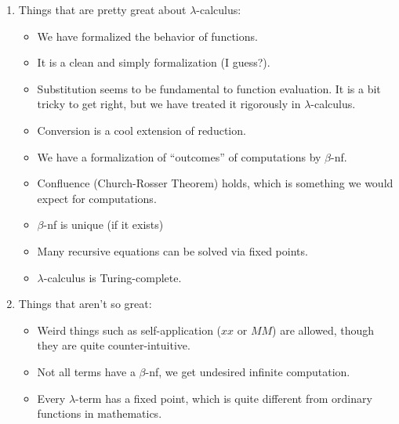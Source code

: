 \documentclass[letterpaper]{article}
\renewcommand{\l}{\lambda}
\newcommand{\bnf}{$\beta$-nf\xspace}
\begin{document}
\begin{enumerate}
	\item Things that are pretty great about $\l$-calculus:
	\begin{itemize}
		\item We have formalized the behavior of functions.
		\item It is a clean and simply formalization (I guess?).
		\item Substitution seems to be fundamental to function evaluation. It is a bit tricky to get right, but we have treated it rigorously in $\l$-calculus.
		\item Conversion is a cool extension of reduction.
		\item We have a formalization of ``outcomes'' of computations by \bnf.
		\item Confluence (Church-Rosser Theorem) holds, which is something we would expect for computations.
		\item \bnf is unique (if it exists)
		\item Many recursive equations can be solved via fixed points.
		\item $\l$-calculus is Turing-complete.
	\end{itemize}
	
	\item Things that aren't so great:
	\begin{itemize}
		\item Weird things such as self-application ($x x$ or $M M$) are allowed, though they are quite counter-intuitive.
		\item Not all terms have a \bnf, we get undesired infinite computation.
		\item Every $\l$-term has a fixed point, which is quite different from ordinary functions in mathematics.
	\end{itemize}
\end{enumerate}
\end{document}
